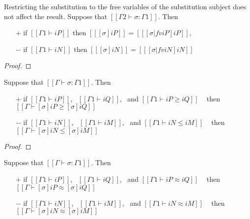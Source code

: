 \begin{lemma}
  \label{lemma:subst-restr-fv}
  Restricting the substitution to the free variables of the
  substitution subject does not affect the result.
  Suppose that $[[Γ2 ⊢ σ : Γ1]]$. Then
  \begin{itemize}
  \item[$+$] if $[[Γ1 ⊢ iP]]$ then $[[ [σ]iP ]] = [[ [σ|fv iP]iP ]]$,
  \item[$-$] if $[[Γ1 ⊢ iN]]$ then $[[ [σ]iN ]] = [[ [σ|fv iN]iN ]]$
  \end{itemize}
\end{lemma}
\begin{proof}
\end{proof}

\begin{lemma}
  \label{lemma:subst-pres-subt}

  Suppose that $[[Γ ⊢ σ : Γ1]]$. Then
  \begin{itemize}
  \item[$+$] if $[[Γ1 ⊢ iP]]$,~ $[[Γ1 ⊢ iQ]]$,~ and $[[Γ1 ⊢ iP ≥ iQ]]$ ~ then $[[Γ ⊢ [σ]iP ≥ [σ]iQ]]$
  \item[$-$] if $[[Γ1 ⊢ iN]]$,~ $[[Γ1 ⊢ iM]]$,~ and $[[Γ1 ⊢ iN ≤ iM]]$ ~ then $[[Γ ⊢ [σ]iN ≤ [σ]iM]]$
  \end{itemize}
\end{lemma}
\begin{proof}
\end{proof}

\begin{corollary}
  \label{corollary:subst-pres-equiv}

  Suppose that $[[Γ ⊢ σ : Γ1]]$. Then
  \begin{itemize}
  \item[$+$] if $[[Γ1 ⊢ iP]]$,~ $[[Γ1 ⊢ iQ]]$,~ and $[[Γ1 ⊢ iP ≈ iQ]]$ ~ then $[[Γ ⊢ [σ]iP ≈ [σ]iQ]]$
  \item[$-$] if $[[Γ1 ⊢ iN]]$,~ $[[Γ1 ⊢ iM]]$,~ and $[[Γ1 ⊢ iN ≈ iM]]$ ~ then $[[Γ ⊢ [σ]iN ≈ [σ]iM]]$
  \end{itemize}
\end{corollary}